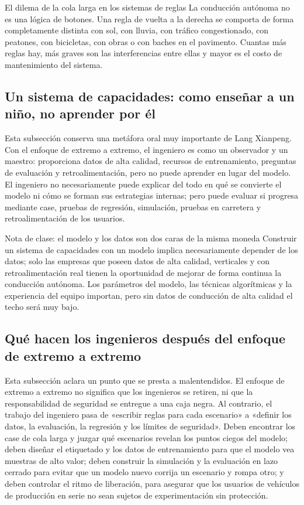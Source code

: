 \begin{warningbox}{El dilema de la cola larga en los sistemas de reglas}
La conducción autónoma no es una lógica de botones. Una regla de vuelta a la derecha se comporta de forma completamente distinta con sol, con lluvia, con tráfico congestionado, con peatones, con bicicletas, con obras o con baches en el pavimento. Cuantas más reglas hay, más graves son las interferencias entre ellas y mayor es el costo de mantenimiento del sistema.
\end{warningbox}

\subsection{Un sistema de capacidades: como enseñar a un niño, no aprender por él}

Esta subsección conserva una metáfora oral muy importante de Lang Xianpeng. Con el enfoque de extremo a extremo, el ingeniero es como un observador y un maestro: proporciona datos de alta calidad, recursos de entrenamiento, preguntas de evaluación y retroalimentación, pero no puede aprender en lugar del modelo. El ingeniero no necesariamente puede explicar del todo en qué se convierte el modelo ni cómo se forman sus estrategias internas; pero puede evaluar si progresa mediante case, pruebas de regresión, simulación, pruebas en carretera y retroalimentación de los usuarios.

\begin{importantbox}{Nota de clase: el modelo y los datos son dos caras de la misma moneda}
Construir un sistema de capacidades con un modelo implica necesariamente depender de los datos; solo las empresas que poseen datos de alta calidad, verticales y con retroalimentación real tienen la oportunidad de mejorar de forma continua la conducción autónoma. Los parámetros del modelo, las técnicas algorítmicas y la experiencia del equipo importan, pero sin datos de conducción de alta calidad el techo será muy bajo.
\end{importantbox}

\subsection{Qué hacen los ingenieros después del enfoque de extremo a extremo}

Esta subsección aclara un punto que se presta a malentendidos. El enfoque de extremo a extremo no significa que los ingenieros se retiren, ni que la responsabilidad de seguridad se entregue a una caja negra. Al contrario, el trabajo del ingeniero pasa de «escribir reglas para cada escenario» a «definir los datos, la evaluación, la regresión y los límites de seguridad». Deben encontrar los case de cola larga y juzgar qué escenarios revelan los puntos ciegos del modelo; deben diseñar el etiquetado y los datos de entrenamiento para que el modelo vea muestras de alto valor; deben construir la simulación y la evaluación en lazo cerrado para evitar que un modelo nuevo corrija un escenario y rompa otro; y deben controlar el ritmo de liberación, para asegurar que los usuarios de vehículos de producción en serie no sean sujetos de experimentación sin protección.

